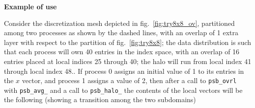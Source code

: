 {\par\noindent\large\bfseries Example of use}
Consider the discretization mesh depicted in fig.~\ref{fig:try8x8_ov},
partitioned among two processes as shown by the dashed lines, with an
overlap of 1 extra layer with respect to the partition of
fig.~\ref{fig:try8x8}; the data 
distribution is such that each process will own 40 entries in the
index space, with an overlap of 16  entries placed at local indices 25 
through 40; the halo will run from local index 41 through local index 48.. If process 0 assigns an initial value of 1 to its entries
in the $x$ vector, and process 1 assigns a value of 2, then after a
call to \verb|psb_ovrl| with \verb|psb_avg_| and a call to
\verb|psb_halo_| the contents of the local vectors will be the
following (showing a transition among the two subdomains)  

